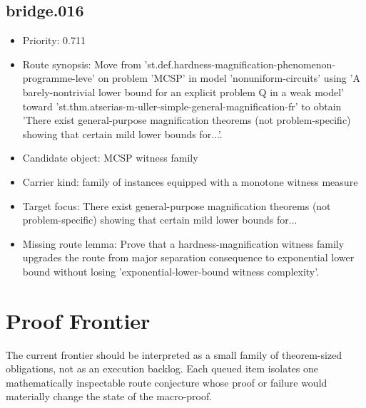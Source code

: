 \documentclass[11pt]{article}
\begin{document}
\subsection*{bridge.016}
\begin{itemize}[leftmargin=*,itemsep=0.2em]
\item Priority: 0.711
\item Route synopsis: Move from 'st.def.hardness-magnification-phenomenon-programme-leve' on problem 'MCSP' in model 'nonuniform-circuits' using 'A barely-nontrivial lower bound for an explicit problem Q in a weak model' toward 'st.thm.atserias-m-uller-simple-general-magnification-fr' to obtain 'There exist general-purpose magnification theorems (not problem-specific) showing that certain mild lower bounds for...'.
\item Candidate object: MCSP witness family
\item Carrier kind: family of instances equipped with a monotone witness measure
\item Target focus: There exist general-purpose magnification theorems (not problem-specific) showing that certain mild lower bounds for...
\item Missing route lemma: Prove that a hardness-magnification witness family upgrades the route from major separation consequence to exponential lower bound without losing 'exponential-lower-bound witness complexity'.
\end{itemize}

\section{Proof Frontier}
The current frontier should be interpreted as a small family of theorem-sized obligations, not as an execution backlog. Each queued item isolates one mathematically inspectable route conjecture whose proof or failure would materially change the state of the macro-proof.

\medskip
\end{document}
